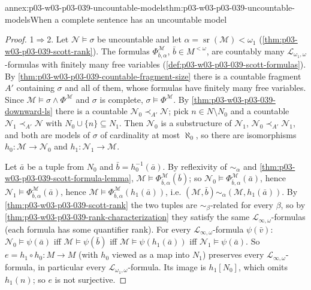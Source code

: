 \begin{annexitem}{annex:p03-w03-p03-039-uncountable-models}{thm:p03-w03-p03-039-uncountable-models}{When a complete sentence has an uncountable model}
\begin{proof}
1\(\Rightarrow\)2. Let \(\mathcal N\models\sigma\) be uncountable and let
\(\alpha=\operatorname{sr}(\mathcal M)<\omega_1\)
(\cref{thm:p03-w03-p03-039-scott-rank}). The formulas
\(\Phi^{\mathcal M}_{\bar b,\alpha}\), \(\bar b\in M^{<\omega}\), are
countably many \(\mathcal L_{\omega_1,\omega}\)-formulas with finitely many
free variables (\cref{def:p03-w03-p03-039-scott-formulas}). By
\cref{thm:p03-w03-p03-039-countable-fragment-size} there is a countable
fragment \(A'\) containing \(\sigma\) and all of them, whose formulas have
finitely many free variables. Since \(\mathcal M\models\sigma\wedge\Phi^{\mathcal M}\)
and \(\sigma\) is complete, \(\sigma\models\Phi^{\mathcal M}\). By
\cref{thm:p03-w03-p03-039-downward-ls} there is a countable
\(\mathcal N_0\prec_{A'}\mathcal N\); pick \(n\in N\setminus N_0\) and a
countable \(\mathcal N_1\prec_{A'}\mathcal N\) with
\(N_0\cup\{n\}\subseteq N_1\). Then \(\mathcal N_0\) is a substructure of
\(\mathcal N_1\), \(\mathcal N_0\prec_{A'}\mathcal N_1\), and both are models of
\(\sigma\) of cardinality at most \(\aleph_0\), so there are isomorphisms
\(h_0:\mathcal M\to\mathcal N_0\) and \(h_1:\mathcal N_1\to\mathcal M\).

Let \(\bar a\) be a tuple from \(N_0\) and \(\bar b=h_0^{-1}(\bar a)\).
By reflexivity of \(\sim_\alpha\) and
\cref{thm:p03-w03-p03-039-scott-formula-lemma},
\(\mathcal M\models\Phi^{\mathcal M}_{\bar b,\alpha}(\bar b)\); so
\(\mathcal N_0\models\Phi^{\mathcal M}_{\bar b,\alpha}(\bar a)\), hence
\(\mathcal N_1\models\Phi^{\mathcal M}_{\bar b,\alpha}(\bar a)\), hence
\(\mathcal M\models\Phi^{\mathcal M}_{\bar b,\alpha}(h_1(\bar a))\), i.e.
\((\mathcal M,\bar b)\sim_\alpha(\mathcal M,h_1(\bar a))\). By
\cref{thm:p03-w03-p03-039-scott-rank} the two tuples are
\(\sim_\beta\)-related for every \(\beta\), so by
\cref{thm:p03-w03-p03-039-rank-characterization} they satisfy the same
\(\mathcal L_{\infty,\omega}\)-formulas (each formula has some quantifier
rank). For every \(\mathcal L_{\infty,\omega}\)-formula \(\psi(\bar v)\):
\(\mathcal N_0\models\psi(\bar a)\) iff \(\mathcal M\models\psi(\bar b)\) iff
\(\mathcal M\models\psi(h_1(\bar a))\) iff \(\mathcal N_1\models\psi(\bar a)\).
So \(e=h_1\circ h_0:M\to M\) (with \(h_0\) viewed as a map into \(N_1\))
preserves every \(\mathcal L_{\infty,\omega}\)-formula, in particular every
\(\mathcal L_{\omega_1,\omega}\)-formula. Its image is \(h_1[N_0]\), which
omits \(h_1(n)\); so \(e\) is not surjective.
\end{proof}
\end{annexitem}

